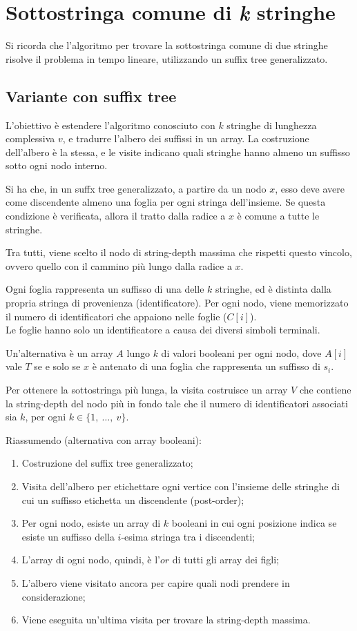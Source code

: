 \section{Sottostringa comune di \textit{k} stringhe}
Si ricorda che l'algoritmo per trovare la sottostringa comune di due stringhe risolve il problema in tempo lineare, utilizzando un suffix tree generalizzato.

\subsection{Variante con suffix tree}
L'obiettivo è estendere l'algoritmo conosciuto con $k$ stringhe di lunghezza complessiva $v$, e tradurre l'albero dei suffissi in un array. La costruzione dell'albero è la stessa, e le visite indicano quali stringhe hanno almeno un suffisso sotto ogni nodo interno. 

Si ha che, in un suffx tree generalizzato, a partire da un nodo $x$, esso deve avere come discendente almeno una foglia per ogni stringa dell'insieme. Se questa condizione è verificata, allora il tratto dalla radice a $x$ è comune a tutte le stringhe.

Tra tutti, viene scelto il nodo di string-depth massima che rispetti questo vincolo, ovvero quello con il cammino più lungo dalla radice a $x$.

Ogni foglia rappresenta un suffisso di una delle $k$ stringhe, ed è distinta dalla propria stringa di provenienza (identificatore). Per ogni nodo, viene memorizzato il numero di identificatori che appaiono nelle foglie ($C[i]$). \\
Le foglie hanno solo un identificatore a causa dei diversi simboli terminali.

Un'alternativa è un array $A$ lungo $k$ di valori booleani per ogni nodo, dove $A[i]$ vale $T$ se e solo se $x$ è antenato di una foglia che rappresenta un suffisso di $s_i$.

Per ottenere la sottostringa più lunga, la visita costruisce un array $V$ che contiene la string-depth del nodo più in fondo tale che il numero di identificatori associati sia $k$, per ogni $k \in \{1,\ \dots,\ v\}$.

Riassumendo (alternativa con array booleani):
\begin{enumerate}
	\item Costruzione del suffix tree generalizzato;
	\item Visita dell'albero per etichettare ogni vertice con l'insieme delle stringhe di cui un suffisso etichetta un discendente (post-order);
	\item Per ogni nodo, esiste un array di $k$ booleani in cui ogni posizione indica se esiste un suffisso della $i$-esima stringa tra i discendenti;
	\item L'array di ogni nodo, quindi, è l'$or$ di tutti gli array dei figli;
	\item L'albero viene visitato ancora per capire quali nodi prendere in considerazione;
	\item Viene eseguita un'ultima visita per trovare la string-depth massima.
\end{enumerate}

